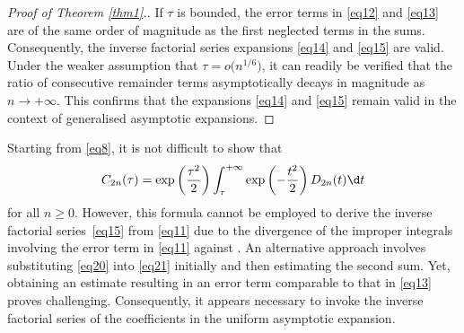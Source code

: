 \begin{proof}[Proof of Theorem \ref{thm1}.]
If $\tau$ is bounded, the error terms in \eqref{eq12} and \eqref{eq13} are of the same order of magnitude as the first neglected terms in the sums. Consequently, the inverse factorial series expansions \eqref{eq14} and \eqref{eq15} are valid. Under the weaker assumption that $\tau = o\big(n^{1/6}\big)$, it can readily be verified that the ratio of consecutive remainder terms asymptotically decays in magnitude as $n\to+\infty$. This confirms that the expansions \eqref{eq14} and \eqref{eq15} remain valid in the context of generalised asymptotic expansions.
\end{proof}

\begin{Remark} Starting from \eqref{eq8}, it is not difficult to show that
\begin{equation}\label{eq21}
C_{2n}(\tau ) = \exp\left(\frac{\tau ^2}{2}\right)\int_\tau^{+\infty} \exp \left(-\frac{t^2}{2}\right)D_{2n} (t)\d t
\end{equation}
for all $n\ge 0$. However, this formula cannot be employed to derive the inverse factorial series~\eqref{eq15} from \eqref{eq11} due to the divergence of the improper integrals involving the error term in \eqref{eq11} against . An alternative approach involves substituting \eqref{eq20} into \eqref{eq21} initially and then estimating the second sum. Yet, obtaining an estimate resulting in an error term comparable to that in \eqref{eq13} proves challenging. Consequently, it appears necessary to invoke the inverse factorial series of the coefficients in the uniform asymptotic expansion.
\end{Remark}
